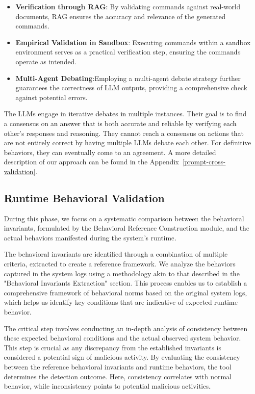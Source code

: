 \begin{itemize}
    \item \textbf{Verification through RAG}: By validating commands against real-world documents, RAG ensures the accuracy and relevance of the generated commands.
    \item \textbf{Empirical Validation in Sandbox}: Executing commands within a sandbox environment serves as a practical verification step, ensuring the commands operate as intended.
    \item \textbf{Multi-Agent Debating}:Employing a multi-agent debate strategy further guarantees the correctness of LLM outputs, providing a comprehensive check against potential errors.
\end{itemize}

The LLMs engage in iterative debates in multiple instances. Their goal is to find a consensus on an answer that is both accurate and reliable by verifying each other's responses and reasoning. They cannot reach a consensus on actions that are not entirely correct by having multiple LLMs debate each other. For definitive behaviors, they can eventually come to an agreement. A more detailed description of our approach can be found in the Appendix~\ref{prompt-cross-validation}.


\subsection{Runtime Behavioral Validation}
During this phase, we focus on a systematic comparison between the behavioral invariants, formulated by the Behavioral Reference Construction module, and the actual behaviors manifested during the system's runtime.

The behavioral invariants are identified through a combination of multiple criteria, extracted to create a reference framework. We analyze the behaviors captured in the system logs using a methodology akin to that described in the "Behavioral Invariants Extraction" section. This process enables us to establish a comprehensive framework of behavioral norms based on the original system logs, which helps us identify key conditions that are indicative of expected runtime behavior.

The critical step involves conducting an in-depth analysis of consistency between these expected behavioral conditions and the actual observed system behavior. This step is crucial as any discrepancy from the established invariants is considered a potential sign of malicious activity. By evaluating the consistency between the reference behavioral invariants and runtime behaviors, the tool determines the detection outcome. Here, consistency correlates with normal behavior, while inconsistency points to potential malicious activities.